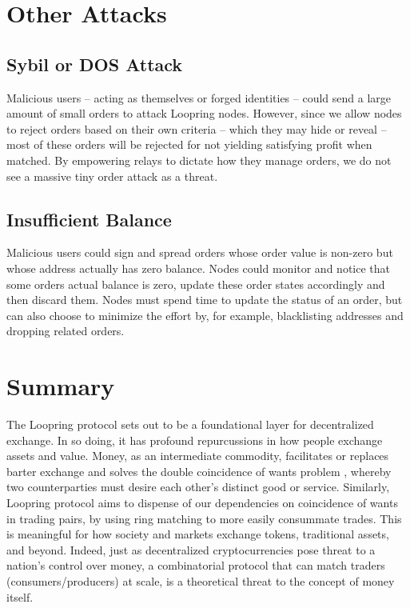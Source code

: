 \documentclass[UTF8,nofonts]{article}
\begin{document}
\begin{multicols}{2}
\section{Other Attacks}

\subsection{Sybil or DOS Attack}
Malicious users -- acting as themselves or forged identities -- could send a large amount of small orders to attack Loopring nodes. However, since we allow nodes to reject orders based on their own criteria -- which they may hide or reveal -- most of these orders will be rejected for not yielding satisfying profit when matched.  By empowering relays to dictate how they manage orders, we do not see a massive tiny order attack as a threat.

\subsection{Insufficient Balance}
Malicious users could sign and spread orders whose order value is non-zero but whose address actually has zero balance. Nodes could monitor and notice that some orders actual balance is zero, update these order states accordingly and then discard them.
Nodes must spend time to update the status of an order, but can also choose to minimize the effort by, for example, blacklisting addresses and dropping related orders.

\section{Summary}

The Loopring protocol sets out to be a foundational layer for decentralized exchange. In so doing, it has profound repurcussions in how people exchange assets and value. Money, as an intermediate commodity, facilitates or replaces barter exchange and solves the double coincidence of wants problem \cite{unenumerated2006}, whereby two counterparties must desire each other's distinct good or service. Similarly, Loopring protocol aims to dispense of our dependencies on coincidence of wants in trading pairs, by using ring matching to more easily consummate trades. This is meaningful for how society and markets exchange tokens, traditional assets, and beyond. Indeed, just as decentralized cryptocurrencies pose threat to a nation's control over money, a combinatorial protocol that can match traders (consumers/producers) at scale, is a theoretical threat to the concept of money itself.


\end{multicols}
\end{document}
